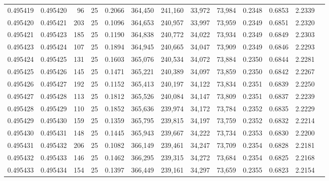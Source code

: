 \begin{tabular}{rrrrrrrrrrrrr}
0.495419 & 0.495420 &    96 &  25 &                                     0.2066 & 364,450 & 241,160 &  33,972 &  73,984 & 0.2348 & 0.6853 & 2.2339 \\
0.495420 & 0.495421 &   203 &  25 &                                     0.1096 & 364,653 & 240,957 &  33,997 &  73,959 & 0.2349 & 0.6851 & 2.2320 \\
0.495421 & 0.495423 &   185 &  25 &                                     0.1190 & 364,838 & 240,772 &  34,022 &  73,934 & 0.2349 & 0.6849 & 2.2303 \\
0.495423 & 0.495424 &   107 &  25 &                                     0.1894 & 364,945 & 240,665 &  34,047 &  73,909 & 0.2349 & 0.6846 & 2.2293 \\
0.495424 & 0.495425 &   131 &  25 &                                     0.1603 & 365,076 & 240,534 &  34,072 &  73,884 & 0.2350 & 0.6844 & 2.2281 \\
0.495425 & 0.495426 &   145 &  25 &                                     0.1471 & 365,221 & 240,389 &  34,097 &  73,859 & 0.2350 & 0.6842 & 2.2267 \\
0.495426 & 0.495427 &   192 &  25 &                                     0.1152 & 365,413 & 240,197 &  34,122 &  73,834 & 0.2351 & 0.6839 & 2.2250 \\
0.495427 & 0.495428 &   113 &  25 &                                     0.1812 & 365,526 & 240,084 &  34,147 &  73,809 & 0.2351 & 0.6837 & 2.2239 \\
0.495428 & 0.495429 &   110 &  25 &                                     0.1852 & 365,636 & 239,974 &  34,172 &  73,784 & 0.2352 & 0.6835 & 2.2229 \\
0.495429 & 0.495430 &   159 &  25 &                                     0.1359 & 365,795 & 239,815 &  34,197 &  73,759 & 0.2352 & 0.6832 & 2.2214 \\
0.495430 & 0.495431 &   148 &  25 &                                     0.1445 & 365,943 & 239,667 &  34,222 &  73,734 & 0.2353 & 0.6830 & 2.2200 \\
0.495431 & 0.495432 &   206 &  25 &                                     0.1082 & 366,149 & 239,461 &  34,247 &  73,709 & 0.2354 & 0.6828 & 2.2181 \\
0.495432 & 0.495433 &   146 &  25 &                                     0.1462 & 366,295 & 239,315 &  34,272 &  73,684 & 0.2354 & 0.6825 & 2.2168 \\
0.495433 & 0.495434 &   154 &  25 &                                     0.1397 & 366,449 & 239,161 &  34,297 &  73,659 & 0.2355 & 0.6823 & 2.2154 \\

\end{tabular}
